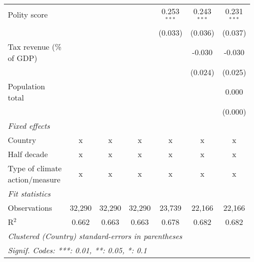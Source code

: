 \begin{tabular}{lcccccc}
   Polity score                                                           &         &                &                & 0.253$^{***}$  & 0.243$^{***}$  & 0.231$^{***}$\\   
                                                                          &         &                &                & (0.033)        & (0.036)        & (0.037)\\   
   Tax revenue (\% of GDP)                                                &         &                &                &                & -0.030         & -0.030\\   
                                                                          &         &                &                &                & (0.024)        & (0.025)\\   
   Population total                                                       &         &                &                &                &                & 0.000\\   
                                                                          &         &                &                &                &                & (0.000)\\   
   \emph{Fixed effects}\\
   Country                                                                & x       & x              & x              & x              & x              & x\\  
   Half decade                                                            & x       & x              & x              & x              & x              & x\\  
   Type of climate action/measure                                         & x       & x              & x              & x              & x              & x\\  
   \midrule \emph{Fit statistics}\\
   Observations                                                           & 32,290  & 32,290         & 32,290         & 23,739         & 22,166         & 22,166\\  
   R$^2$                                                                  & 0.662   & 0.663          & 0.663          & 0.678          & 0.682          & 0.682\\  
   \midrule
   \multicolumn{7}{l}{\emph{Clustered (Country) standard-errors in parentheses}}\\
   \multicolumn{7}{l}{\emph{Signif. Codes: ***: 0.01, **: 0.05, *: 0.1}}\\
\end{tabular}
\par\endgroup


